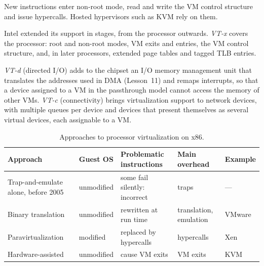 \documentclass[../main.tex]{subfiles}
\begin{document}
New instructions enter non-root mode, read and write the VM control
structure and issue hypercalls.  Hosted hypervisors
such as KVM rely on them.

Intel extended its support in stages, from the processor outwards.
\emph{VT-x} covers the processor: root and non-root modes, VM exits and
entries, the VM control structure, and, in later processors, extended page
tables and tagged TLB entries.

\emph{VT-d} (directed I/O) adds to the chipset an I/O memory management unit
that translates the addresses used in DMA (Lesson~11) and remaps interrupts,
so that a device assigned to a VM in the passthrough model cannot access the
memory of other VMs.  \emph{VT-c} (connectivity) brings virtualization
support to network devices, with multiple queues per device and devices
that present themselves as several virtual devices, each assignable to
a VM.

\begin{table}[htbp]
  \centering
  \caption{Approaches to processor virtualization on x86.}
  \label{tab:l12-cpu}
  \small
  \begin{tabular}{@{}>{\raggedright}p{24mm}>{\raggedright}p{16mm}%
      >{\raggedright}p{29mm}>{\raggedright}p{20mm}%
      >{\raggedright\arraybackslash}p{14mm}@{}}
    \toprule
    Approach & Guest OS & Problematic instructions & Main overhead
      & Example \\
    \midrule
    Trap-and-emulate alone, before 2005 & unmodified & some fail silently:
      incorrect & traps & --- \\
    \addlinespace
    Binary translation & unmodified & rewritten at run time
      & translation, emulation & VMware \\
    \addlinespace
    Paravirtualization & modified & replaced by hypercalls & hypercalls
      & Xen \\
    \addlinespace
    Hardware-assisted & unmodified & cause VM exits & VM exits & KVM \\
    \bottomrule
  \end{tabular}
\end{table}
\end{document}
